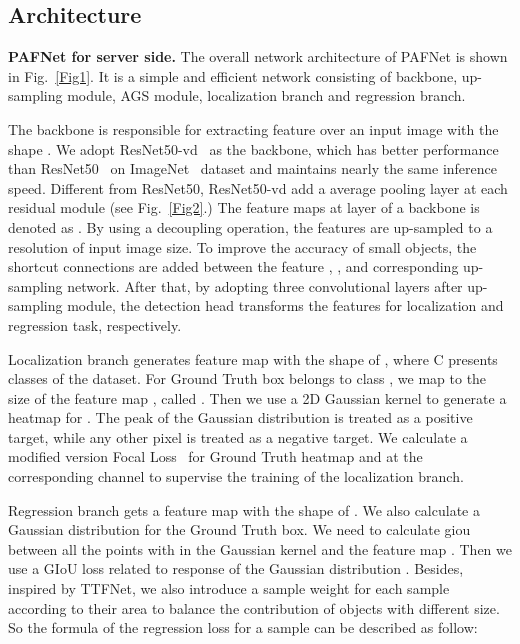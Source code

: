 \documentclass[10pt,twocolumn,letterpaper]{article}
\begin{document}
	\subsection{Architecture}
\textbf{PAFNet for server side.} The overall network architecture of PAFNet is shown in Fig.~\ref{Fig1}. It is a simple and efficient network consisting of backbone, up-sampling module, AGS module, localization branch and regression branch.
    
The backbone is responsible for extracting feature over an input image with the shape . We adopt ResNet50-vd~\cite{long2020pp} as the backbone, which has better performance than ResNet50~\cite{theckedath2020detecting} on ImageNet~\cite{deng2009imagenet} dataset and maintains nearly the same inference speed. Different from ResNet50, ResNet50-vd add a  average pooling layer at each residual module (see Fig.~\ref{Fig2}.) The feature maps at layer  of a backbone is denoted as . By using a decoupling operation, the features are up-sampled to a  resolution of input image size. To improve the accuracy of small objects, the shortcut connections are added between the feature , , and corresponding up-sampling network. After that, by adopting three convolutional layers after up-sampling module, the detection head transforms the features for localization and regression task, respectively.
    
Localization branch generates feature map  with the shape of , where C presents classes of the dataset. For Ground Truth box  belongs to class , we map  to the size of the feature map , called . Then we use a 2D Gaussian kernel  to generate a heatmap for . The peak of the Gaussian distribution is treated as a positive target, while any other pixel is treated as a negative target. We calculate a modified version Focal Loss~\cite{lin2017focal} for Ground Truth heatmap  and  at the corresponding  channel to supervise the training of the localization branch. 

Regression branch gets a feature map  with the shape of . We also calculate a Gaussian distribution  for the Ground Truth box. We need to calculate giou ~\cite{rezatofighi2019generalized} between all the points with in the Gaussian kernel and the feature map . Then we use a GIoU loss  related to response of the Gaussian distribution . Besides, inspired by TTFNet, we also introduce a sample weight  for each sample according to their area to balance the contribution of objects with different size.
    So the formula of the regression loss for a sample can be described as follow:
    
\end{document}
